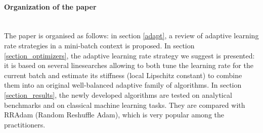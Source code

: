 \paragraph{Organization of the paper}
~~\\
The paper is organised as follows: in section \ref{adapt}, a review of adaptive learning rate strategies
in a mini-batch context 
is proposed. 
In section \ref{section_optimizers}, the adaptive learning rate strategy we suggest is presented: it is based on several linesearches allowing to both tune the learning rate for the
current batch and estimate its stiffness (local Lipschitz
constant) to combine them into an original well-balanced adaptive family of algorithms. 
In section \ref{section_results}, the newly developed algorithms are tested on analytical benchmarks and on classical machine learning tasks. They are compared with RRAdam (Random Reshuffle Adam), which is very popular among the practitioners.   


